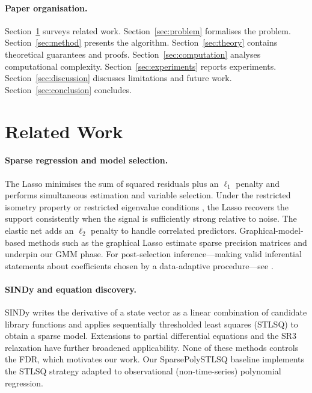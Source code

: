 \documentclass[11pt, a4paper]{article}
\begin{document}
\paragraph{Paper organisation.}
Section~\ref{sec:related} surveys related work.
Section~\ref{sec:problem} formalises the problem.
Section~\ref{sec:method} presents the algorithm.
Section~\ref{sec:theory} contains theoretical guarantees and proofs.
Section~\ref{sec:computation} analyses computational complexity.
Section~\ref{sec:experiments} reports experiments.
Section~\ref{sec:discussion} discusses limitations and future work.
Section~\ref{sec:conclusion} concludes.

\section{Related Work}
\label{sec:related}

\paragraph{Sparse regression and model selection.}
The Lasso \cite{tibshirani1996regression} minimises the sum of squared
residuals plus an $\ell_1$ penalty and performs simultaneous estimation and
variable selection.  Under the restricted isometry property
\cite{donoho2006compressed} or restricted eigenvalue conditions
\cite{buhlmann2011statistics}, the Lasso recovers the support consistently
when the signal is sufficiently strong relative to noise.  The elastic net
\cite{zou2005regularization} adds an $\ell_2$ penalty to handle correlated
predictors.  Graphical-model-based methods such as the graphical Lasso
\cite{friedman2008sparse} estimate sparse precision matrices and underpin
our GMM phase.  For post-selection inference---making valid inferential
statements about coefficients chosen by a data-adaptive procedure---see
\cite{berk2013valid}.

\paragraph{SINDy and equation discovery.}
SINDy \cite{brunton2016discovering} writes the derivative of a state vector
as a linear combination of candidate library functions and applies
sequentially thresholded least squares (STLSQ) to obtain a sparse model.
Extensions to partial differential equations \cite{rudy2017data} and the
SR3 relaxation \cite{zheng2019unified} have further broadened applicability.
None of these methods controls the FDR, which motivates our work.  Our
SparsePolySTLSQ baseline implements the STLSQ strategy adapted to
observational (non-time-series) polynomial regression.
\end{document}
